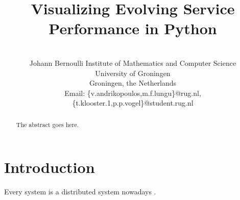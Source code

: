 \documentclass[conference]{IEEEtran}
\begin{document}
%
\title{Visualizing Evolving Service Performance in Python }



\author{
\\
Johann Bernoulli Institute of Mathematics and Computer Science\\
University of Groningen\\
Groningen, the Netherlands\\
Email: \{v.andrikopoulos,m.f.lungu\}@rug.nl, \{t.klooster.1,p.p.vogel\}@student.rug.nl
}

\maketitle

\begin{abstract}
The abstract goes here.
\end{abstract}


\IEEEpeerreviewmaketitle



\section{Introduction}
Every system is a distributed system nowadays \cite{}. 
\end{document}
